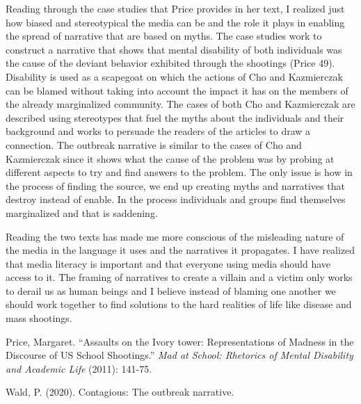 \documentclass[11pt]{article}
\begin{document}
Reading through the case studies that Price provides in her text, I realized just how biased and stereotypical the media can be and the role it plays in enabling the spread of narrative that are based on myths. The case studies work to construct a narrative that shows that mental disability of both individuals was the cause of the deviant behavior exhibited through the shootings (Price 49). Disability is used as a scapegoat on which the actions of Cho and Kazmierczak can be blamed without taking into account the impact it has on the members of the already marginalized community. The cases of both Cho and Kazmierczak are described using stereotypes that fuel the myths about the individuals and their background and works to persuade the readers of the articles to draw a connection. The outbreak narrative is similar to the cases of Cho and Kazmierczak since it shows what the cause of the problem was by probing at different aspects to try and find answers to the problem. The only issue is how in the process of finding the source, we end up creating myths and narratives that destroy instead of enable. In the process individuals and groups find themselves marginalized and that is saddening.

Reading the two texts has made me more conscious of the misleading nature of the media in the language it uses and the narratives it propagates. I have realized that media literacy is important and that everyone using media should have access to it. The framing of narratives to create a villain and a victim only works to derail us as human beings and I believe instead of blaming one another we should work together to find solutions to the hard realities of life like disease and mass shootings.

\begin{references}
\item Price, Margaret. ``Assaults on the Ivory tower: Representations of Madness in the Discourse of US School Shootings.'' \textit{Mad at School: Rhetorics of Mental Disability and Academic Life} (2011): 141-75.
\item Wald, P. (2020). Contagious: The outbreak narrative.
\end{references}
\end{document}
